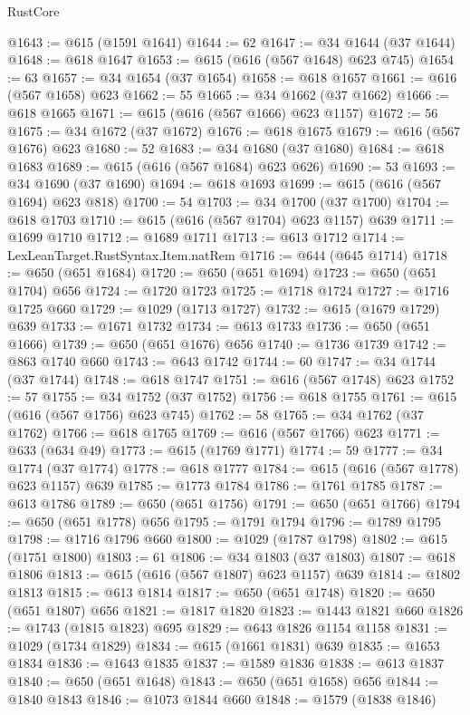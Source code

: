 \begin{lexlean}{RustCore}
\begin{coremodule}
@1643 := @615 (@1591 @1641)
@1644 := 62
@1647 := @34 @1644 (@37 @1644)
@1648 := @618 @1647
@1653 := @615 (@616 (@567 @1648) @623 @745)
@1654 := 63
@1657 := @34 @1654 (@37 @1654)
@1658 := @618 @1657
@1661 := @616 (@567 @1658) @623
@1662 := 55
@1665 := @34 @1662 (@37 @1662)
@1666 := @618 @1665
@1671 := @615 (@616 (@567 @1666) @623 @1157)
@1672 := 56
@1675 := @34 @1672 (@37 @1672)
@1676 := @618 @1675
@1679 := @616 (@567 @1676) @623
@1680 := 52
@1683 := @34 @1680 (@37 @1680)
@1684 := @618 @1683
@1689 := @615 (@616 (@567 @1684) @623 @626)
@1690 := 53
@1693 := @34 @1690 (@37 @1690)
@1694 := @618 @1693
@1699 := @615 (@616 (@567 @1694) @623 @818)
@1700 := 54
@1703 := @34 @1700 (@37 @1700)
@1704 := @618 @1703
@1710 := @615 (@616 (@567 @1704) @623 @1157) @639
@1711 := @1699 @1710
@1712 := @1689 @1711
@1713 := @613 @1712
@1714 := LexLeanTarget.RustSyntax.Item.natRem
@1716 := @644 (@645 @1714)
@1718 := @650 (@651 @1684)
@1720 := @650 (@651 @1694)
@1723 := @650 (@651 @1704) @656
@1724 := @1720 @1723
@1725 := @1718 @1724
@1727 := @1716 @1725 @660
@1729 := @1029 (@1713 @1727)
@1732 := @615 (@1679 @1729) @639
@1733 := @1671 @1732
@1734 := @613 @1733
@1736 := @650 (@651 @1666)
@1739 := @650 (@651 @1676) @656
@1740 := @1736 @1739
@1742 := @863 @1740 @660
@1743 := @643 @1742
@1744 := 60
@1747 := @34 @1744 (@37 @1744)
@1748 := @618 @1747
@1751 := @616 (@567 @1748) @623
@1752 := 57
@1755 := @34 @1752 (@37 @1752)
@1756 := @618 @1755
@1761 := @615 (@616 (@567 @1756) @623 @745)
@1762 := 58
@1765 := @34 @1762 (@37 @1762)
@1766 := @618 @1765
@1769 := @616 (@567 @1766) @623
@1771 := @633 (@634 @49)
@1773 := @615 (@1769 @1771)
@1774 := 59
@1777 := @34 @1774 (@37 @1774)
@1778 := @618 @1777
@1784 := @615 (@616 (@567 @1778) @623 @1157) @639
@1785 := @1773 @1784
@1786 := @1761 @1785
@1787 := @613 @1786
@1789 := @650 (@651 @1756)
@1791 := @650 (@651 @1766)
@1794 := @650 (@651 @1778) @656
@1795 := @1791 @1794
@1796 := @1789 @1795
@1798 := @1716 @1796 @660
@1800 := @1029 (@1787 @1798)
@1802 := @615 (@1751 @1800)
@1803 := 61
@1806 := @34 @1803 (@37 @1803)
@1807 := @618 @1806
@1813 := @615 (@616 (@567 @1807) @623 @1157) @639
@1814 := @1802 @1813
@1815 := @613 @1814
@1817 := @650 (@651 @1748)
@1820 := @650 (@651 @1807) @656
@1821 := @1817 @1820
@1823 := @1443 @1821 @660
@1826 := @1743 (@1815 @1823) @695
@1829 := @643 @1826 @1154 @1158
@1831 := @1029 (@1734 @1829)
@1834 := @615 (@1661 @1831) @639
@1835 := @1653 @1834
@1836 := @1643 @1835
@1837 := @1589 @1836
@1838 := @613 @1837
@1840 := @650 (@651 @1648)
@1843 := @650 (@651 @1658) @656
@1844 := @1840 @1843
@1846 := @1073 @1844 @660
@1848 := @1579 (@1838 @1846)

\end{coremodule}
\end{lexlean}
